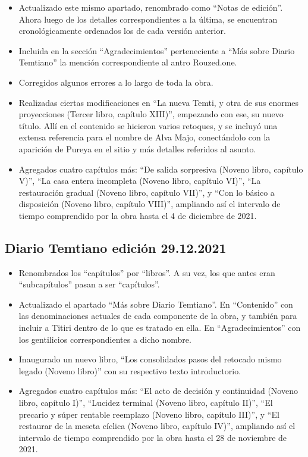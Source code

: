 \documentclass[
  spanish,
]{book}
\begin{document}
\begin{itemize}
\item
  Actualizado este mismo apartado, renombrado como ``Notas de edición''. Ahora luego de los detalles correspondientes a la última, se encuentran cronológicamente ordenados los de cada versión anterior.
\item
  Incluida en la sección ``Agradecimientos'' perteneciente a ``Más sobre Diario Temtiano'' la mención correspondiente al antro Rouzed.one.
\item
  Corregidos algunos errores a lo largo de toda la obra.
\item
  Realizadas ciertas modificaciones en ``La nueva Temti, y otra de sus enormes proyecciones (Tercer libro, capítulo XIII)'', empezando con ese, su nuevo título. Allí en el contenido se hicieron varios retoques, y se incluyó una extensa referencia para el nombre de Alva Majo, conectándolo con la aparición de Pureya en el sitio y más detalles referidos al asunto.
\item
  Agregados cuatro capítulos más: ``De salida sorpresiva (Noveno libro, capítulo V)'', ``La casa entera incompleta (Noveno libro, capítulo VI)'', ``La restauración gradual (Noveno libro, capítulo VII)'', y ``Con lo básico a disposición (Noveno libro, capítulo VIII)'', ampliando así el intervalo de tiempo comprendido por la obra hasta el 4 de diciembre de 2021.
\end{itemize}

\hypertarget{diario-temtiano-ediciuxf3n-29.12.2021}{%
\subsection*{Diario Temtiano edición 29.12.2021}\label{diario-temtiano-ediciuxf3n-29.12.2021}}

\begin{itemize}
\item
  Renombrados los ``capítulos'' por ``libros''. A su vez, los que antes eran ``subcapítulos'' pasan a ser ``capítulos''.
\item
  Actualizado el apartado ``Más sobre Diario Temtiano''. En ``Contenido'' con las denominaciones actuales de cada componente de la obra, y también para incluir a Titiri dentro de lo que es tratado en ella. En ``Agradecimientos'' con los gentilicios correspondientes a dicho nombre.
\item
  Inaugurado un nuevo libro, ``Los consolidados pasos del retocado mismo legado (Noveno libro)'' con su respectivo texto introductorio.
\item
  Agregados cuatro capítulos más: ``El acto de decisión y continuidad (Noveno libro, capítulo I)'', ``Lucidez terminal (Noveno libro, capítulo II)'', ``El precario y súper rentable reemplazo (Noveno libro, capítulo III)'', y ``El restaurar de la meseta cíclica (Noveno libro, capítulo IV)'', ampliando así el intervalo de tiempo comprendido por la obra hasta el 28 de noviembre de 2021.
\end{itemize}
\end{document}
